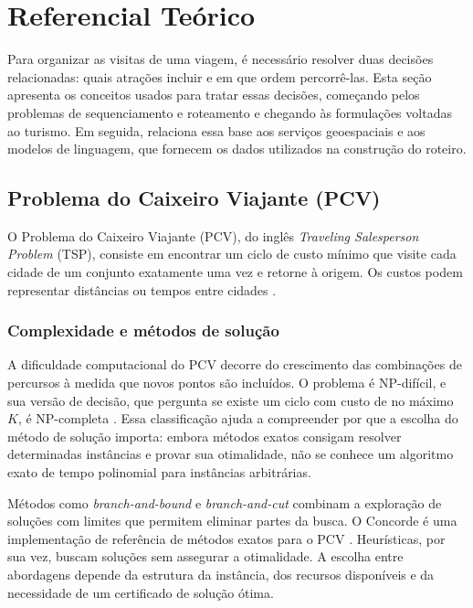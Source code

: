 \chapter[Referencial Teórico]{Referencial Teórico}
\label{cap:teoria}

Para organizar as visitas de uma viagem, é necessário resolver duas decisões relacionadas: quais atrações incluir e em que ordem percorrê-las. Esta seção apresenta os conceitos usados para tratar essas decisões, começando pelos problemas de sequenciamento e roteamento e chegando às formulações voltadas ao turismo. Em seguida, relaciona essa base aos serviços geoespaciais e aos modelos de linguagem, que fornecem os dados utilizados na construção do roteiro.

\section{Problema do Caixeiro Viajante (PCV)}

O Problema do Caixeiro Viajante (PCV), do inglês \textit{Traveling Salesperson Problem} (TSP), consiste em encontrar um ciclo de custo mínimo que visite cada cidade de um conjunto exatamente uma vez e retorne à origem. Os custos podem representar distâncias ou tempos entre cidades \cite{applegate2006}.

\subsection{Complexidade e métodos de solução}

A dificuldade computacional do PCV decorre do crescimento das combinações de percursos à medida que novos pontos são incluídos. O problema é NP-difícil, e sua versão de decisão, que pergunta se existe um ciclo com custo de no máximo $K$, é NP-completa \cite{applegate2006,karp1972}. Essa classificação ajuda a compreender por que a escolha do método de solução importa: embora métodos exatos consigam resolver determinadas instâncias e provar sua otimalidade, não se conhece um algoritmo exato de tempo polinomial para instâncias arbitrárias.

Métodos como \textit{branch-and-bound} e \textit{branch-and-cut} combinam a exploração de soluções com limites que permitem eliminar partes da busca. O Concorde é uma implementação de referência de métodos exatos para o PCV \cite{applegate2006}. Heurísticas, por sua vez, buscam soluções sem assegurar a otimalidade. A escolha entre abordagens depende da estrutura da instância, dos recursos disponíveis e da necessidade de um certificado de solução ótima.

